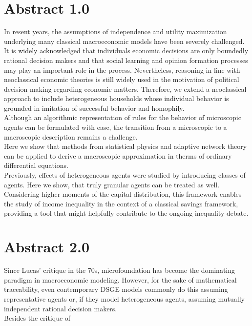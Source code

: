 \section{Abstract 1.0}

In resent years, the assumptions of independence and utility maximization underlying many classical macroeconomic models have been severely challenged.  \\
It is widely acknowledged that individuals economic decisions are only boundedly rational decision makers and that social learning and opinion formation processes may play an important role in the process. Nevertheless, reasoning in line with neoclassical economic theories is still widely used in the motivation of political decision making regarding economic matters. Therefore, we extend a neoclassical approach to include heterogeneous households whose individual behavior is grounded in imitation of successful behavior and homophily. \\
Although an algorithmic representation of rules for the behavior of microscopic agents can be formulated with ease, the transition from a microscopic to a macroscopic description remains a challenge. \\
Here we show that methods from statistical physics and adaptive network theory can be applied to derive a macroscopic approximation in therms of ordinary differential equations. \\
Previously, effects of heterogeneous agents were studied by introducing classes of agents. Here we show, that truly granular agents can be treated as well.\\
Considering higher moments of the capital distribution, this framework enables the study of income inequality in the context of a classical savings framework, providing a tool that might helpfully contribute to the ongoing inequality debate. \\

\section{Abstract 2.0}

Since Lucas' critique in the 70s, microfoundation has become the dominating paradigm in macroeconomic modeling. However, for the sake of mathematical traceability, even contemporary DSGE models commonly do this assuming representative agents or, if they model heterogeneous agents, assuming mutually independent rational decision makers. \\
Besides the critique of 

